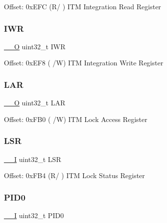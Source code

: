 Offset\+: 0x\+E\+FC (R/ ) I\+TM Integration Read Register \mbox{\label{struct_i_t_m___type_ae13374b53589f16b2fc2c868d779a9c7}} 
\subsubsection{\texorpdfstring{I\+WR}{IWR}}
{\footnotesize\ttfamily \mbox{\hyperlink{core__cm3_8h_a7e25d9380f9ef903923964322e71f2f6}{\+\_\+\+\_\+O}} uint32\+\_\+t I\+WR}

Offset\+: 0x\+E\+F8 ( /W) I\+TM Integration Write Register \mbox{\label{struct_i_t_m___type_aa2c0f411bbcc7b7c7a558a964996dc11}} 
\subsubsection{\texorpdfstring{L\+AR}{LAR}}
{\footnotesize\ttfamily \mbox{\hyperlink{core__cm3_8h_a7e25d9380f9ef903923964322e71f2f6}{\+\_\+\+\_\+O}} uint32\+\_\+t L\+AR}

Offset\+: 0x\+F\+B0 ( /W) I\+TM Lock Access Register \mbox{\label{struct_i_t_m___type_a8387dc0dc9f45c8a81cfc98bfff7ae32}} 
\subsubsection{\texorpdfstring{L\+SR}{LSR}}
{\footnotesize\ttfamily \mbox{\hyperlink{core__cm3_8h_af63697ed9952cc71e1225efe205f6cd3}{\+\_\+\+\_\+I}} uint32\+\_\+t L\+SR}

Offset\+: 0x\+F\+B4 (R/ ) I\+TM Lock Status Register \mbox{\label{struct_i_t_m___type_ad6c87ae4ca1aa56b4369a97fca639926}} 
\subsubsection{\texorpdfstring{P\+I\+D0}{PID0}}
{\footnotesize\ttfamily \mbox{\hyperlink{core__cm3_8h_af63697ed9952cc71e1225efe205f6cd3}{\+\_\+\+\_\+I}} uint32\+\_\+t P\+I\+D0}

